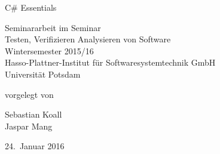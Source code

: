 \documentclass[11pt, a4paper]{article}
\begin{document}
          

\begin{titlepage}
  \begin{center} 
    \mbox{}
    \vspace{1cm}
    
    {\huge C\# Essentials \\[1em] {\LARGE }}  
        
    \vspace{5cm}
    
    Seminararbeit im Seminar \\[1em]
    {\large \sc Testen, Verifizieren Analysieren von Software} \\[1em]
    Wintersemester 2015/16 \\[1em]
    Hasso-Plattner-Institut für Softwaresystemtechnik GmbH \\[1em]
    Universität Potsdam
    
    \vspace{4cm}
    
		vorgelegt von
		
    \vspace{1em}
    
		{\Large Sebastian Koall} \\
		{\Large Jaspar Mang}
		
    \vspace{4em}
    
    24.~Januar 2016
  \end{center}
\end{titlepage}


\setcounter{page}{1}

\tableofcontents 

\newpage

\printnoidxglossaries

\newpage

 
\newpage

\newpage

\newpage


\newpage




\end{document}
